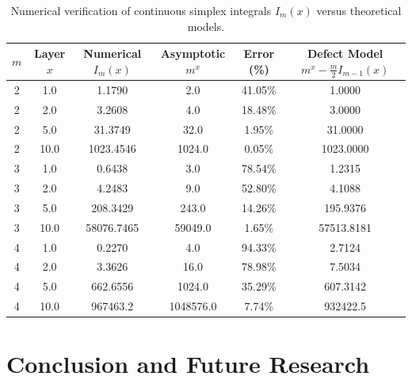 \documentclass[11pt,a4paper]{article}
\theoremstyle{plain}
\theoremstyle{definition}
\theoremstyle{remark}
\numberwithin{equation}{section}
\begin{document}
\begin{table}[htbp]
\centering
\small
\caption{Numerical verification of continuous simplex integrals $I_m(x)$ versus theoretical models.}
\label{tab:numerical_verification}
\begin{tabular}{cccccc}
\toprule
$m$ & Layer $x$ & Numerical $I_m(x)$ & Asymptotic $m^x$ & Error (\%) & Defect Model $m^x - \frac{m}{2}I_{m-1}(x)$ \\
\midrule
2 & 1.0 & 1.1790 & 2.0 & 41.05\% & 1.0000 \\
2 & 2.0 & 3.2608 & 4.0 & 18.48\% & 3.0000 \\
2 & 5.0 & 31.3749 & 32.0 & 1.95\% & 31.0000 \\
2 & 10.0 & 1023.4546 & 1024.0 & 0.05\% & 1023.0000 \\
\midrule
3 & 1.0 & 0.6438 & 3.0 & 78.54\% & 1.2315 \\
3 & 2.0 & 4.2483 & 9.0 & 52.80\% & 4.1088 \\
3 & 5.0 & 208.3429 & 243.0 & 14.26\% & 195.9376 \\
3 & 10.0 & 58076.7465 & 59049.0 & 1.65\% & 57513.8181 \\
\midrule
4 & 1.0 & 0.2270 & 4.0 & 94.33\% & 2.7124 \\
4 & 2.0 & 3.3626 & 16.0 & 78.98\% & 7.5034 \\
4 & 5.0 & 662.6556 & 1024.0 & 35.29\% & 607.3142 \\
4 & 10.0 & 967463.2 & 1048576.0 & 7.74\% & 932422.5 \\
\bottomrule
\end{tabular}
\end{table}

\section{Conclusion and Future Research}
\end{document}

